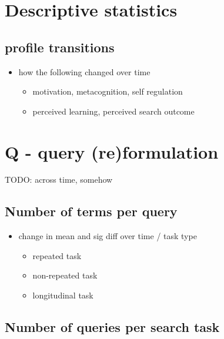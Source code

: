 \documentclass[letterpaper, nobind]{templates/ociamthesis}
\providecommand{\tightlist}{%
  \setlength{\itemsep}{0pt}\setlength{\parskip}{0pt}}
\begin{document}
\hypertarget{descriptive-statistics}{%
\section{Descriptive statistics}\label{descriptive-statistics}}

\hypertarget{profile-transitions}{%
\subsection{profile transitions}\label{profile-transitions}}

\begin{itemize}
\tightlist
\item
  how the following changed over time

  \begin{itemize}
  \tightlist
  \item
    motivation, metacognition, self regulation
  \item
    perceived learning, perceived search outcome
  \end{itemize}
\end{itemize}

\hypertarget{q---query-reformulation}{%
\section{Q - query (re)formulation}\label{q---query-reformulation}}

TODO: across time, somehow

\hypertarget{number-of-terms-per-query}{%
\subsection{Number of terms per query}\label{number-of-terms-per-query}}

\begin{itemize}
\tightlist
\item
  change in mean and sig diff over time / task type

  \begin{itemize}
  \tightlist
  \item
    repeated task
  \item
    non-repeated task
  \item
    longitudinal task
  \end{itemize}
\end{itemize}

\hypertarget{number-of-queries-per-search-task}{%
\subsection{Number of queries per search task}\label{number-of-queries-per-search-task}}
\end{document}
